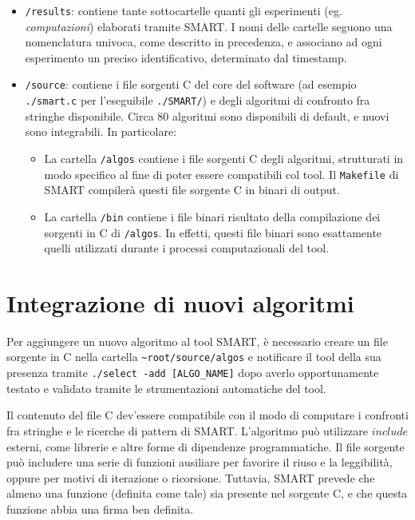 \begin{itemize}
\begin{sexylisting}{data/italianTexts/index.txt}
    \end{sexylisting}
    \item \verb|/results|: contiene tante sottocartelle quanti gli esperimenti (eg. \textit{computazioni}) elaborati tramite SMART. I nomi delle cartelle seguono una nomenclatura univoca, come descritto in precedenza, e associano ad ogni esperimento un preciso identificativo, determinato dal timestamp.
    \item \verb|/source|: contiene i file sorgenti C del core del software (ad esempio \verb|./smart.c| per l'eseguibile \verb|./SMART/|) e degli algoritmi di confronto fra stringhe disponibile. Circa 80 algoritmi sono disponibili di default, e nuovi sono integrabili. In particolare:
    \begin{itemize}
        \item La cartella \verb|/algos| contiene i file sorgenti C degli algoritmi, strutturati in modo specifico al fine di poter essere compatibili col tool. Il \verb|Makefile| di SMART compilerà questi file sorgente C in binari di output. 
        \item La cartella \verb|/bin| contiene i file binari risultato della compilazione dei sorgenti in C di \verb|/algos|. In effetti, questi file binari sono esattamente quelli utilizzati durante i processi computazionali del tool. 
    \end{itemize}
\end{itemize}

\section{Integrazione di nuovi algoritmi}

Per aggiungere un nuovo algoritmo al tool SMART, è necessario creare un file sorgente in C nella cartella \verb|~root/source/algos| e notificare il tool della sua presenza tramite \verb|./select -add [ALGO_NAME]| dopo averlo opportunamente testato e validato tramite le strumentazioni automatiche del tool. 

\vspace{3mm}

Il contenuto del file C dev'essere compatibile con il modo di computare i confronti fra stringhe e le ricerche di pattern di SMART. L'algoritmo può utilizzare $include$ esterni, come librerie e altre forme di dipendenze programmatiche. Il file sorgente può includere una serie di funzioni ausiliare per favorire il riuso e la leggibilità, oppure per motivi di iterazione o ricorsione. Tuttavia, SMART prevede che almeno una funzione (definita come tale) sia presente nel sorgente C, e che questa funzione abbia una firma ben definita.

